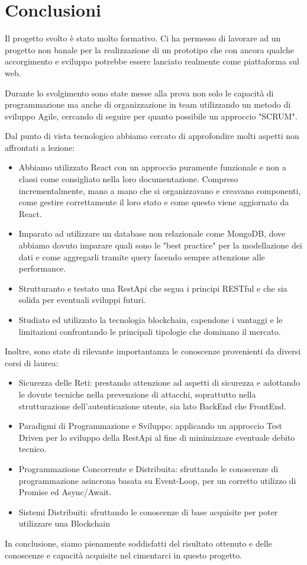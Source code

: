 \section{Conclusioni}

Il progetto svolto è stato molto formativo. Ci ha permesso
di lavorare ad un progetto non banale per la realizzazione di un prototipo che 
con ancora qualche accorgimento e sviluppo potrebbe essere 
lanciato realmente come piattaforma sul web.

Durante lo svolgimento sono state messe alla prova non solo le capacità di programmazione ma anche di organizzazione in team
utilizzando un metodo di sviluppo Agile, cercando di seguire per quanto possibile un approccio "SCRUM".

Dal punto di vista tecnologico abbiamo cercato di approfondire molti aspetti non affrontati a lezione:
\begin{itemize}
	\item Abbiamo utilizzato React con un approccio puramente funzionale e non a classi come consigliato nella loro documentazione. 
	Compreso incrementalmente, mano a mano che si organizzavano e creavano componenti, come gestire correttamente il loro stato e come questo viene aggiornato da React.	
	\item Imparato ad utilizzare un database non relazionale come MongoDB, dove abbiamo dovuto imparare quali sono le "best practice"
		per la modellazione dei dati e come aggregarli tramite query facendo sempre attenzione alle performance.
	\item Strutturanto e testato una RestApi che segua i principi RESTful e che sia solida per eventuali sviluppi futuri.
	\item Studiato ed utilizzato la tecnologia blockchain, capendone i vantaggi e le limitazioni confrontando le principali tipologie che dominano il mercato.
\end{itemize}
 
Inoltre, sono state di rilevante importantanza le conoscenze provenienti da diversi corsi di laurea:
\begin{itemize}
	\item Sicurezza delle Reti: prestando attenzione ad aspetti di sicurezza e adottando le dovute tecniche nella
prevenzione di attacchi, soprattutto nella strutturazione dell'autenticazione utente, sia lato BackEnd che FrontEnd.
	\item Paradigmi di Programmazione e Sviluppo: applicando un approccio Test Driven per lo sviluppo della RestApi al fine di minimizzare eventuale debito tecnico.
  \item Programmazione Concorrente e Distribuita: sfruttando le conoscenze di programmazione asincrona basata su Event-Loop, per un corretto utilizzo di Promise ed Async/Await.
  \item Sistemi Distribuiti: sfruttando le conoscenze di base acquisite per poter utilizzare una Blockchain 
\end{itemize}

In conclusione, siamo pienamente soddisfatti del risultato ottenuto e delle
conoscenze e capacità acquisite nel cimentarci in questo progetto.